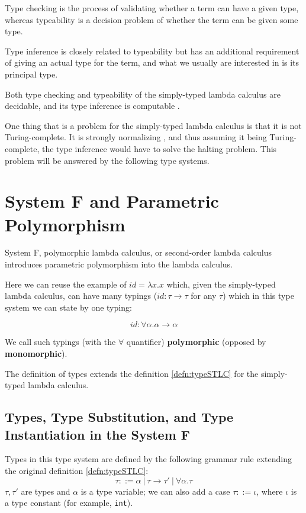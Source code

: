 Type checking is the process of validating whether a term can have a given type, whereas typeability is a decision problem of whether the term can be given some type.

Type inference is closely related to typeability but has an additional requirement of giving an actual type for the term, and what we usually are interested in is its principal type.

Both type checking and typeability of the simply-typed lambda calculus are decidable, and its type inference is computable \cite{barendregt1992lambda}.

One thing that is a problem for the simply-typed lambda calculus is that it is not Turing-complete. It is strongly normalizing \cite{barendregt1992lambda}, and thus assuming it being Turing-complete, the type inference would have to solve the halting problem. This problem will be answered by the following type systems.

\section{System F and Parametric Polymorphism}

System F, polymorphic lambda calculus, or second-order lambda calculus introduces parametric polymorphism into the lambda calculus.

Here we can reuse the example of $id = \lambda x . x$ which, given the simply-typed lambda calculus, can have many typings ($id : \tau \rightarrow \tau$ for any $\tau$) which in this type system we can state by one typing:

$$id : \forall \alpha . \alpha \rightarrow \alpha$$

We call such typings (with the $\forall$ quantifier) \textbf{polymorphic} (opposed by \textbf{monomorphic}).

The definition of types extends the definition \ref{defn:typeSTLC} for the simply-typed lambda calculus.

\subsection{Types, Type Substitution, and Type Instantiation in the System F }

\begin{defn} Types in this type system are defined by the following grammar rule extending the original definition \ref{defn:typeSTLC}:
    $$\tau ::= \alpha\ |\ \tau \rightarrow \tau'\ |\ \forall \alpha . \tau$$
    $\tau, \tau'$ are types and $\alpha$ is a type variable; we can also add a case $\tau ::= \iota$, where $\iota$ is a type constant (for example, \lstinline{int}).
\end{defn}


